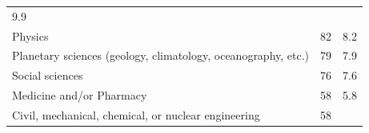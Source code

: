 \documentclass[]{article}
\begin{document}
\begin{longtable}[]{@{}lrr@{}}
\begin{minipage}[t]{0.05\columnwidth}
9.9\strut
\end{minipage}\tabularnewline
\begin{minipage}[t]{0.81\columnwidth}\raggedright\strut
Physics\strut
\end{minipage} & \begin{minipage}[t]{0.05\columnwidth}\raggedleft\strut
82\strut
\end{minipage} & \begin{minipage}[t]{0.05\columnwidth}\raggedleft\strut
8.2\strut
\end{minipage}\tabularnewline
\begin{minipage}[t]{0.81\columnwidth}\raggedright\strut
Planetary sciences (geology, climatology, oceanography, etc.)\strut
\end{minipage} & \begin{minipage}[t]{0.05\columnwidth}\raggedleft\strut
79\strut
\end{minipage} & \begin{minipage}[t]{0.05\columnwidth}\raggedleft\strut
7.9\strut
\end{minipage}\tabularnewline
\begin{minipage}[t]{0.81\columnwidth}\raggedright\strut
Social sciences\strut
\end{minipage} & \begin{minipage}[t]{0.05\columnwidth}\raggedleft\strut
76\strut
\end{minipage} & \begin{minipage}[t]{0.05\columnwidth}\raggedleft\strut
7.6\strut
\end{minipage}\tabularnewline
\begin{minipage}[t]{0.81\columnwidth}\raggedright\strut
Medicine and/or Pharmacy\strut
\end{minipage} & \begin{minipage}[t]{0.05\columnwidth}\raggedleft\strut
58\strut
\end{minipage} & \begin{minipage}[t]{0.05\columnwidth}\raggedleft\strut
5.8\strut
\end{minipage}\tabularnewline
\begin{minipage}[t]{0.81\columnwidth}\raggedright\strut
Civil, mechanical, chemical, or nuclear engineering\strut
\end{minipage} & \begin{minipage}[t]{0.05\columnwidth}\raggedleft\strut
58\strut
\end{minipage} & \begin{minipage}[t]{0.05\columnwidth}\raggedleft\strut

\end{minipage}
\end{longtable}
\end{document}
